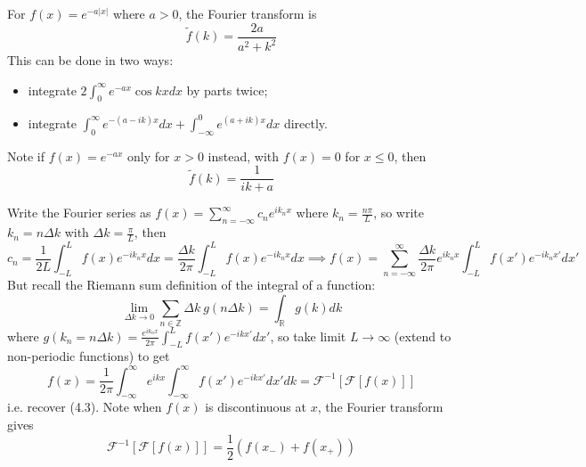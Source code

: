 \documentclass[a4paper]{article}
\begin{document}
\begin{eg}
For $f(x)=e^{-a|x|}$ where $a>0$, the Fourier transform is
\begin{equation}
    \tilde{f}(k)=\frac{2a}{a^2+k^2}\tag{4.6a}
\end{equation}
This can be done in two ways:
\begin{itemize}
    \item integrate $2\int_0^\infty e^{-ax}\cos kxdx$ by parts twice;
    \item integrate $\int_0^\infty e^{-(a-ik)x}dx+\int_{-\infty}^0e^{(a+ik)x}dx$ directly.
\end{itemize}
Note if $f(x)=e^{-ax}$ only for $x>0$ instead, with $f(x)=0$ for $x\leq 0$, then
\begin{equation}
    \tilde{f}(k)=\frac{1}{ik+a}\tag{4.6b}
\end{equation}
\end{eg}
\begin{remarks}
Write the Fourier series as
$f(x)=\sum_{n=-\infty}^\infty c_ne^{ik_nx}$
where $k_n=\frac{n\pi}{L}$, so write $k_n=n\Delta k$ with $\Delta k=\frac{\pi}{L}$, then
$$c_n=\frac{1}{2L}\int_{-L}^Lf(x)e^{-ik_nx}dx=\frac{\Delta k}{2\pi}\int_{-L}^Lf(x)e^{-ik_nx}dx\implies f(x)=\sum_{n=-\infty}^\infty\frac{\Delta k}{2\pi}e^{ik_nx}\int_{-L}^Lf(x')e^{-ik_nx'}dx'$$
But recall the Riemann sum definition of the integral of a function: 
$$\lim_{\Delta k\rightarrow0}\sum_{n\in\mathbb{Z}}\Delta k~g(n\Delta k)=\int_{\mathbb{R}}g(k)dk$$
where $g(k_n=n\Delta k)=\frac{e^{ik_nx}}{2\pi}\int_{-L}^Lf(x')e^{-ikx'}dx'$, so take limit $L\rightarrow\infty$ (extend to non-periodic functions) to get $$f(x)=\frac{1}{2\pi}\int_{-\infty}^\infty e^{ikx}\int_{-\infty}^\infty f(x')e^{-ikx'}dx'dk=\mathcal{F}^{-1}[\mathcal{F}[f(x)]]$$ i.e. recover (4.3). Note when $f(x)$ is discontinuous at $x$, the Fourier transform gives
\begin{equation}
    \mathcal{F}^{-1}[\mathcal{F}[f(x)]]=\frac{1}{2}(f(x_-)+f(x_+))\tag{4.7}
\end{equation}
\end{remarks}
\end{document}

